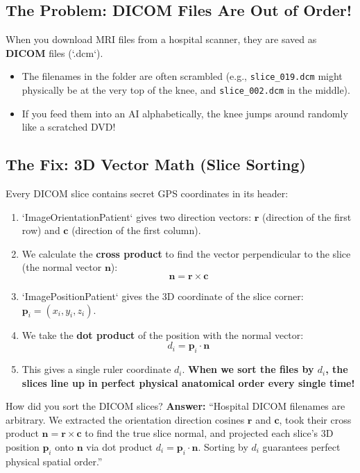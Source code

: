 \documentclass[11pt,a4paper]{article}
\begin{document}
\subsection{The Problem: DICOM Files Are Out of Order!}
When you download MRI files from a hospital scanner, they are saved as \textbf{DICOM} files (`.dcm`). 
\begin{itemize}[leftmargin=*]
    \item The filenames in the folder are often scrambled (e.g., \texttt{slice\_019.dcm} might physically be at the very top of the knee, and \texttt{slice\_002.dcm} in the middle).
    \item If you feed them into an AI alphabetically, the knee jumps around randomly like a scratched DVD!
\end{itemize}

\subsection{The Fix: 3D Vector Math (Slice Sorting)}
Every DICOM slice contains secret GPS coordinates in its header:
\begin{enumerate}[leftmargin=*]
    \item `ImageOrientationPatient` gives two direction vectors: $\mathbf{r}$ (direction of the first row) and $\mathbf{c}$ (direction of the first column).
    \item We calculate the \textbf{cross product} to find the vector perpendicular to the slice (the normal vector $\mathbf{n}$):
    $$\mathbf{n} = \mathbf{r} \times \mathbf{c}$$
    \item `ImagePositionPatient` gives the 3D coordinate of the slice corner: $\mathbf{p}_i = (x_i, y_i, z_i)$.
    \item We take the \textbf{dot product} of the position with the normal vector:
    $$d_i = \mathbf{p}_i \cdot \mathbf{n}$$
    \item This gives a single ruler coordinate $d_i$. \textbf{When we sort the files by $d_i$, the slices line up in perfect physical anatomical order every single time!}
\end{enumerate}

\begin{vivabox}{How did you sort the DICOM slices?}
\textbf{Answer:} “Hospital DICOM filenames are arbitrary. We extracted the orientation direction cosines $\mathbf{r}$ and $\mathbf{c}$, took their cross product $\mathbf{n} = \mathbf{r} \times \mathbf{c}$ to find the true slice normal, and projected each slice's 3D position $\mathbf{p}_i$ onto $\mathbf{n}$ via dot product $d_i = \mathbf{p}_i \cdot \mathbf{n}$. Sorting by $d_i$ guarantees perfect physical spatial order.”
\end{vivabox}
\end{document}
